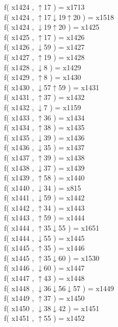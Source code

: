 f( x1424 , $\uparrow$17 ) = x1713 \\
f( x1424 , $\uparrow$17$\downarrow$19$\uparrow$20 ) = x1518 \\
f( x1424 , $\downarrow$19$\uparrow$20 ) = x1425 \\
f( x1425 , $\uparrow$17 ) = x1426 \\
f( x1426 , $\downarrow$59 ) = x1427 \\
f( x1427 , $\uparrow$19 ) = x1428 \\
f( x1428 , $\downarrow$8 ) = x1429 \\
f( x1429 , $\uparrow$8 ) = x1430 \\
f( x1430 , $\downarrow$57$\uparrow$59 ) = x1431 \\
f( x1431 , $\uparrow$37 ) = x1432 \\
f( x1432 , $\downarrow$7 ) = x1159 \\
f( x1433 , $\uparrow$36 ) = x1434 \\
f( x1434 , $\uparrow$38 ) = x1435 \\
f( x1435 , $\downarrow$39 ) = x1436 \\
f( x1436 , $\downarrow$35 ) = x1437 \\
f( x1437 , $\uparrow$39 ) = x1438 \\
f( x1438 , $\downarrow$37 ) = x1439 \\
f( x1439 , $\uparrow$58 ) = x1440 \\
f( x1440 , $\downarrow$34 ) = x815 \\
f( x1441 , $\downarrow$59 ) = x1442 \\
f( x1442 , $\uparrow$34 ) = x1443 \\
f( x1443 , $\uparrow$59 ) = x1444 \\
f( x1444 , $\uparrow$35$\downarrow$55 ) = x1651 \\
f( x1444 , $\downarrow$55 ) = x1445 \\
f( x1445 , $\uparrow$35 ) = x1446 \\
f( x1445 , $\uparrow$35$\downarrow$60 ) = x1530 \\
f( x1446 , $\downarrow$60 ) = x1447 \\
f( x1447 , $\uparrow$43 ) = x1448 \\
f( x1448 , $\downarrow$36$\downarrow$56$\downarrow$57 ) = x1449 \\
f( x1449 , $\uparrow$37 ) = x1450 \\
f( x1450 , $\downarrow$38$\downarrow$42 ) = x1451 \\
f( x1451 , $\uparrow$55 ) = x1452 \\
